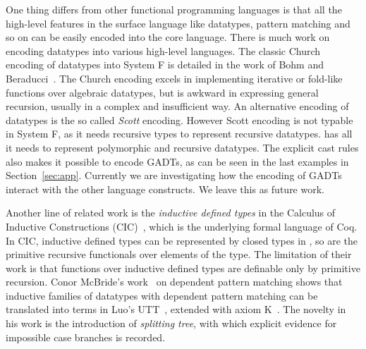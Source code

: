 One thing \name differs from other functional programming languages is
that all the high-level features in the surface language like
datatypes, pattern matching and so on can be easily encoded into the
core language. There is much work on encoding datatypes into various
high-level languages. The classic Church encoding of datatypes into
System F is detailed in the work of Bohm and
Beraducci~\cite{Bohm1985}. The Church encoding excels in implementing
iterative or fold-like functions over algebraic datatypes, but is
awkward in expressing general recursion, usually in a complex and
insufficient way. An alternative encoding of datatypes is the so
called \emph{Scott} encoding. However Scott encoding is not typable in
System F, as it needs recursive types to represent recursive
datatypes. \name has all it needs to represent polymorphic and
recursive datatypes. The explicit cast rules also makes it possible to
encode GADTs, as can be seen in the last examples in
Section~\ref{sec:app}. Currently we are investigating how the encoding
of GADTs interact with the other language constructs. We leave this as
future work.

Another line of related work is the \emph{inductive defined types} in
the Calculus of Inductive Constructions (CIC)~\cite{cic}, which is the
underlying formal language of Coq. In CIC, inductive defined types can
be represented by closed types in \coc, so are the primitive recursive
functionals over elements of the type. The limitation of their work is
that functions over inductive defined types are definable only by
primitive recursion. Conor McBride's work~\cite{elim:pi:pattern} on
dependent pattern matching shows that inductive families of datatypes
with dependent pattern matching can be translated into terms in Luo's
UTT~\cite{Luo:UTT}, extended with axiom K~\cite{axiomK}. The novelty
in his work is the introduction of \emph{splitting tree}, with which
explicit evidence for impossible case branches is recorded.

 



